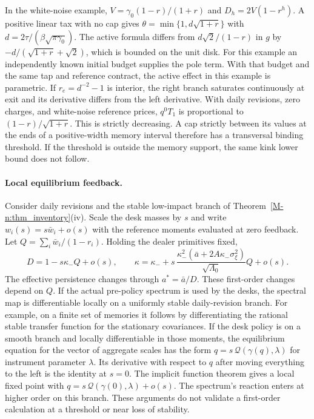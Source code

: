 \documentclass[12pt]{article}
\theoremstyle{definition}
\theoremstyle{remark}
\begin{document}
In the white-noise example, $V=\gamma_0(1-r)/(1+r)$ and
$D_h=2V(1-r^h)$. A positive linear tax with no cap gives
$\theta=\min\{1,d\sqrt{1+r}\}$ with $d=2\tau/(\beta\sqrt{\pi\gamma_0})$.
The active formula differs from $d\sqrt{2}/(1-r)$ in $g$ by
$-d/(\sqrt{1+r}+\sqrt{2})$, which is bounded on the unit disk. For this example
an independently known initial budget supplies the pole term. With that budget and the same tap and reference contract, the active effect in this example is parametric. If $r_e=d^{-2}-1$ is interior,
the right branch saturates continuously at exit and its derivative differs from
the left derivative. With daily revisions, zero charges, and white-noise reference
prices, $q^0 T_1$ is proportional to $(1-r)/\sqrt{1+r}$. This is strictly decreasing.
A cap strictly between its values at the ends of a positive-width memory interval
therefore has a transversal binding threshold. If the threshold is outside the
memory support, the same kink lower bound does not follow.

\paragraph{Local equilibrium feedback.}
Consider daily revisions and the stable low-impact branch of
Theorem~\ref{M-n:thm_inventory}(iv). Scale the desk masses by $s$ and write
$w_i(s)=s\bar w_i+o(s)$ with the reference moments evaluated at zero feedback.
Let $Q=\sum_i\bar w_i/(1-r_i)$. Holding the dealer primitives fixed,
\[
 D=1-s\kappa_-Q+o(s),\qquad
 \kappa=\kappa_-+
 s\,\frac{\kappa_-^2(\bar a+2A\kappa_-\sigma_\xi^2)}{\sqrt{\Lambda_0}}Q+o(s).
\]
The effective persistence changes through $a^*=\bar a/D$. These first-order changes
depend on $Q$. If the actual pre-policy spectrum is used by the desks, the spectral
map is differentiable locally on a uniformly stable daily-revision branch. For example,
on a finite set of memories it follows by differentiating the rational stable
transfer function for the stationary covariances. If the desk policy is on a smooth
branch and locally differentiable in those moments, the equilibrium equation for the
vector of aggregate scales has the form $q=s\,\mathcal Q(\gamma(q),\lambda)$ for
instrument parameter $\lambda$. Its derivative with respect to $q$ after moving
everything to the left is the identity at $s=0$. The implicit function theorem gives
a local fixed point with $q=s\,\mathcal Q(\gamma(0),\lambda)+o(s)$. The spectrum's
reaction enters at higher order on this branch. These arguments do not validate a
first-order calculation at a threshold or near loss of stability.
\end{document}
